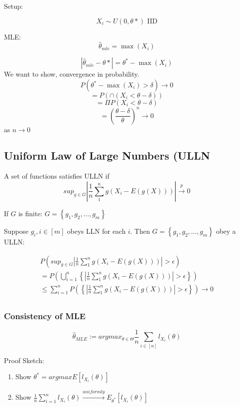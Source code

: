 \documentclass[aos,preprint]{imsart}
\numberwithin{equation}{section}
\theoremstyle{plain}
\begin{document}
Setup: 

$$ X_i \sim U(0,\theta*) \text{ IID}$$

MLE: 
$$ \hat \theta_{mle} = \max(X_i) $$

$$ |\hat \theta_{mle} - \theta* | = \theta^* - \max(X_i) $$
We want to show, convergence in probability. 
$$ P( \theta^* - \max(X_i) >\delta) \rightarrow 0 $$
$$ = P( \cap ( X_i < \theta - \delta)) $$
$$ = \Pi P(  X_i < \theta - \delta) $$
$$ =  \left ( \frac{\theta - \delta}{\theta} \right )^{n}\rightarrow 0$$ as $ n \rightarrow 0 $

\subsection{Uniform Law of Large Numbers (ULLN}

A set of functions satisfies ULLN if $$ sup_{g \in G}\left | \frac{1}{n}\sum_{1}^{n}g\left ( X_{i} - E\left ( g\left ( X \right ) \right )\right ) \right | \overset{p}\rightarrow 0 $$

If $ G $ is finite: $ G = \left \{ g_{1}, g_{2},\dots,g_{m} \right \}$ 

Suppose $ g_{i}, i \in \left [ m \right ] $ obeys LLN for each $ i $. Then 
$ G = \left \{ g_{1}, g_{2},\dots,g_{m} \right \}$ obey a ULLN:

\begin{align*} 
P\left (sup_{g \in G}\left | \frac{1}{n}\sum_{1}^{n}g\left ( X_{i} - E\left ( g\left ( X \right ) \right )\right ) \right | > \epsilon \right) \\
= P\left (\bigcup_{i=1}^{n} \left \{ \left | \frac{1}{n}\sum_{1}^{n}g\left ( X_{i} - E\left ( g\left ( X \right ) \right )\right ) \right | > \epsilon \right \} \right) \\
\leq \sum_{i=1}^{n} P\left (\left \{ \left | \frac{1}{n}\sum_{1}^{n}g\left ( X_{i} - E\left ( g\left ( X \right ) \right )\right ) \right | > \epsilon \right \} \right) \rightarrow 0 \tag{Boole's inequality} \\
\end{align*}

\subsubsection{Consistency of MLE}
$$\hat \theta_{MLE} := argmax_{\theta \in \Theta}\frac{1}{n}\sum_{i \in \left [ n \right ]}l_{X_{i}}\left ( \theta \right ) $$

Proof Sketch:
\begin{enumerate}
\item Show $ \theta^{*}=argmaxE\left [ l_{X_{i}}\left ( \theta \right ) \right ] $
\item Show $ \frac{1}{n}\sum_{i=1}^{n}l_{X_{i}}\left ( \theta \right ) \overset{uniformly} \rightarrow E_{\theta^{*}}\left [ l_{X_{i}}\left ( \theta \right ) \right ] $
\end{enumerate}
\end{document}
